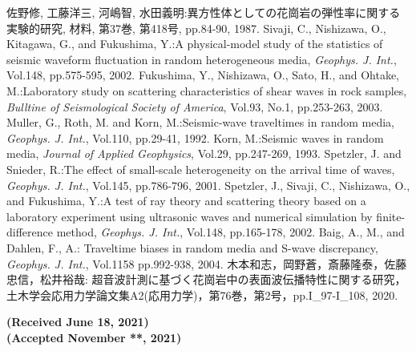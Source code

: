 \documentclass{jsce}
\begin{document}
\begin{thebibliography}{99}
\begin{spacing}{1.175}
\newpage
{}
	佐野修, 工藤洋三, 河嶋智, 水田義明:異方性体としての花崗岩の弾性率に関する実験的研究, 
	材料, 第37巻, 第418号, pp.84-90, 1987.
	Sivaji, C., Nishizawa, O., Kitagawa, G., and Fukushima, Y.:A physical-model study of the statistics of seismic waveform fluctuation in random heterogeneous media, 
	{\it Geophys. J. Int.}, Vol.148, pp.575-595, 2002. 
	Fukushima, Y., Nishizawa, O., Sato, H., and Ohtake, M.:Laboratory study on scattering characteristics of shear waves 
	in rock samples, {\it Bulltine of Seismological Society of America}, Vol.93, No.1, pp.253-263, 2003.
	Muller, G., Roth, M. and Korn, M.:Seismic-wave traveltimes in random media,
	{\it Geophys. J. Int.}, Vol.110, pp.29-41, 1992. 
	Korn, M.:Seismic waves in random media, 
	{\it Journal of Applied Geophysics}, Vol.29, pp.247-269, 1993.
	Spetzler, J. and Snieder, R.:The effect of small-scale heterogeneity on the arrival time of waves, 
	{\it Geophys. J. Int.}, Vol.145, pp.786-796, 2001. 
	Spetzler, J., Sivaji, C., Nishizawa, O., and Fukushima, Y.:A test of ray theory and scattering theory based on
	a laboratory experiment using ultrasonic waves and numerical simulation by finite-difference method, 
	{\it Geophys. J. Int.}, Vol.148, pp.165-178, 2002. 
	Baig, A., M., and Dahlen, F., A.: Traveltime biases in random media and S-wave discrepancy, 
	{\it Geophys. J. Int.}, Vol.1158 pp.992-938, 2004. 
	木本和志，岡野蒼，斎藤隆泰，佐藤忠信，松井裕哉: 超音波計測に基づく花崗岩中の表面波伝播特性に関する研究，
	土木学会応用力学論文集A2(応用力学)，第76巻，第2号，pp.I\_97-I\_108, 2020.
\end{spacing}
\end{thebibliography}
\begin{flushright}
	\small
	\bf{ (Received June 18, 2021)\\
	(Accepted November **, 2021)}
\end{flushright}
\newpage
\lastpagecontrol[0.0cm]{18.0cm}
\end{document}
